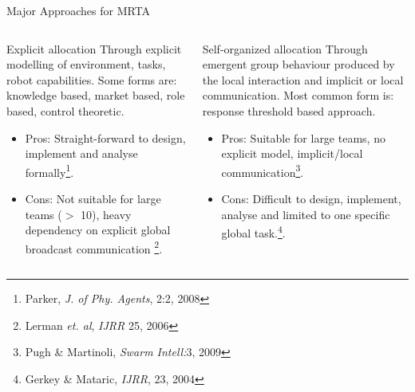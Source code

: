 \documentclass{beamer}
\begin{document}
\begin{frame}[t]{Major Approaches for MRTA}
\vspace*{-0.4cm}
 \begin{columns}
\begin{block}{Explicit allocation}
Through \alert{explicit modelling} of environment, tasks, robot capabilities. Some forms are: \alert{knowledge based, market based, role based, control theoretic}. 
\begin{itemize}
\item \small Pros: Straight-forward to design, implement and analyse formally\footnote{\scriptsize Parker, \textit{J. of Phy. Agents}, 2:2, 2008}. %
\item \small Cons: \alert{Not suitable for large teams ($>$ 10)}, heavy dependency on explicit global broadcast communication \footnote{\scriptsize Lerman \textit{et. al}, \textit{IJRR} 25, 2006}.
\end{itemize}
\end{block}
\begin{block}{Self-organized allocation}
Through \alert{emergent group behaviour} produced by the local interaction and implicit or local communication. Most common form is: \alert{response threshold} based approach.
\begin{itemize}
\item \small Pros: Suitable for large teams, no explicit model, implicit/local communication\footnote{\scriptsize Pugh \& Martinoli, \textit{Swarm Intell:}3, 2009}.
\item \small Cons: \alert{Difficult to design, implement, analyse and limited to one specific global task.\footnote{\scriptsize Gerkey \& Mataric, \textit{IJRR}, 23, 2004}.} %
\end{itemize}
\end{block}
\end{columns}
\end{frame}
\end{document}
